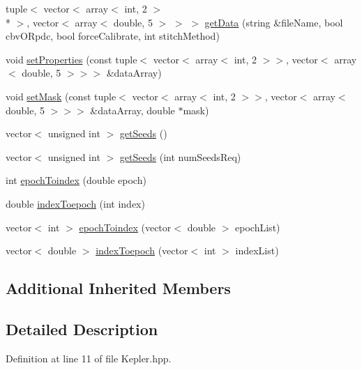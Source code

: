 \begin{DoxyCompactItemize}
\item 
tuple$<$ vector$<$ array$<$ int, 2 $>$\\*
 $>$, vector$<$ array$<$ double, 5 $>$ $>$ $>$ \hyperlink{class_kepler_obj_a4f90cf9b7aa47fdaca37001c9032fea1}{get\-Data} (string \&file\-Name, bool cbv\-O\-Rpdc, bool force\-Calibrate, int stitch\-Method)
\item 
void \hyperlink{class_kepler_obj_a18ece34d36959a5eb0c75c34bdeea2ae}{set\-Properties} (const tuple$<$ vector$<$ array$<$ int, 2 $>$$>$, vector$<$ array$<$ double, 5 $>$$>$$>$ \&data\-Array)
\item 
void \hyperlink{class_kepler_obj_a0712485c7f8f87047dff986c06bca53e}{set\-Mask} (const tuple$<$ vector$<$ array$<$ int, 2 $>$$>$, vector$<$ array$<$ double, 5 $>$$>$$>$ \&data\-Array, double $\ast$mask)
\item 
vector$<$ unsigned int $>$ \hyperlink{class_kepler_obj_ab0d9b5872db2ceaf8a589da7a6c5b24a}{get\-Seeds} ()
\item 
vector$<$ unsigned int $>$ \hyperlink{class_kepler_obj_ad493b1e9867acac00840229d31b71e2a}{get\-Seeds} (int num\-Seeds\-Req)
\item 
int \hyperlink{class_kepler_obj_ac57d999ff4bdb6cbcfc710803d034cc1}{epoch\-Toindex} (double epoch)
\item 
double \hyperlink{class_kepler_obj_a7b822c1719305ecc53c4594fab113c99}{index\-Toepoch} (int index)
\item 
vector$<$ int $>$ \hyperlink{class_kepler_obj_a707be7b6de877f1d4a66f022f5f7b08e}{epoch\-Toindex} (vector$<$ double $>$ epoch\-List)
\item 
vector$<$ double $>$ \hyperlink{class_kepler_obj_a89d53cab1519c3cb5d337da37565b60d}{index\-Toepoch} (vector$<$ int $>$ index\-List)
\end{DoxyCompactItemize}
\subsection*{Additional Inherited Members}


\subsection{Detailed Description}


Definition at line 11 of file Kepler.\-hpp.



